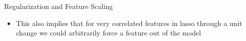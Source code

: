 \documentclass[11pt,compress,t,notes=noshow, xcolor=table]{beamer}
\begin{document}
\begin{vbframe}{Regularization and Feature Scaling}
\begin{itemize}
    \item This also implies that for very correlated features in lasso through a unit change we could arbitrarily force a feature out of the model
\end{itemize}

\framebreak

\end{vbframe}
\end{document}
